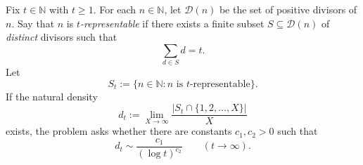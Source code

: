 Fix $t\in\mathbb N$ with $t\ge 1$. For each $n\in\mathbb N$, let $\mathcal D(n)$ be the set of positive divisors of $n$.
Say that $n$ is \emph{$t$-representable} if there exists a finite subset $S\subseteq \mathcal D(n)$ of \emph{distinct} divisors such that
\[
\sum_{d\in S} d = t.
\]
Let
\[
S_t := \{n\in\mathbb N : n\text{ is $t$-representable}\}.
\]
If the natural density
\[
 d_t := \lim_{X\to\infty} \frac{|S_t\cap\{1,2,\dots,X\}|}{X}
\]
exists, the problem asks whether there are constants $c_1,c_2>0$ such that
\[
 d_t \sim \frac{c_1}{(\log t)^{c_2}} \qquad (t\to\infty).
\]
